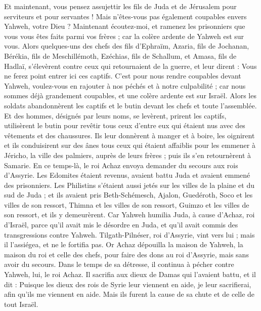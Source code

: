 \begin{multicols}{2}
Et maintenant, vous pensez assujettir les fils de Juda et de Jérusalem pour serviteurs et pour servantes ! Mais n'êtes-vous pas également coupables envers Yahweh, votre Dieu ?
Maintenant écoutez-moi, et ramenez les prisonniers que vous vous êtes faits parmi vos frères ; car la colère ardente de Yahweh est sur vous.
Alors quelques-uns des chefs des fils d'Ephraïm, Azaria, fils de Jochanan, Bérékia, fils de Meschillémoth, Ezéchias, fils de Schallum, et Amasa, fils de Hadlaï, s'élevèrent contre ceux qui retournaient de la guerre,
et leur dirent : Vous ne ferez point entrer ici ces captifs. C'est pour nous rendre coupables devant Yahweh, voulez-vous en rajouter à nos péchés et à notre culpabilité ; car nous sommes déjà grandement coupables, et une colère ardente est sur Israël.
Alors les soldats abandonnèrent les captifs et le butin devant les chefs et toute l'assemblée.
Et des hommes, désignés par leurs noms, se levèrent, prirent les captifs, utilisèrent le butin pour revêtir tous ceux d'entre eux qui étaient nus avec des vêtements et des chaussures. Ils leur donnèrent à manger et à boire, les oignirent et ils conduisirent sur des ânes tous ceux qui étaient affaiblis pour les emmener à Jéricho, la ville des palmiers, auprès de leurs frères ; puis ils s'en retournèrent à Samarie.
En ce temps-là, le roi Achaz envoya demander du secours aux rois d'Assyrie.
Les Edomites étaient revenus, avaient battu Juda et avaient emmené des prisonniers.
Les Philistins s'étaient aussi jetés sur les villes de la plaine et du sud de Juda ; et ils avaient pris Beth-Schémesch, Ajalon, Guedéroth, Soco et les villes de son ressort, Thimna et les villes de son ressort, Guimzo et les villes de son ressort, et ils y demeurèrent.
Car Yahweh humilia Juda, à cause d'Achaz, roi d'Israël, parce qu'il avait mis le désordre en Juda, et qu'il avait commis des transgressions contre Yahweh.
Tilgath-Pilnéser, roi d'Assyrie, vint vers lui ; mais il l'assiégea, et ne le fortifia pas.
Or Achaz dépouilla la maison de Yahweh, la maison du roi et celle des chefs, pour faire des dons au roi d'Assyrie, mais sans avoir du secours.
Dans le temps de sa détresse, il continua à pécher contre Yahweh, lui, le roi Achaz.
Il sacrifia aux dieux de Damas qui l'avaient battu, et il dit : Puisque les dieux des rois de Syrie leur viennent en aide, je leur sacrifierai, afin qu'ils me viennent en aide. Mais ils furent la cause de sa chute et de celle de tout Israël.

\end{multicols}
